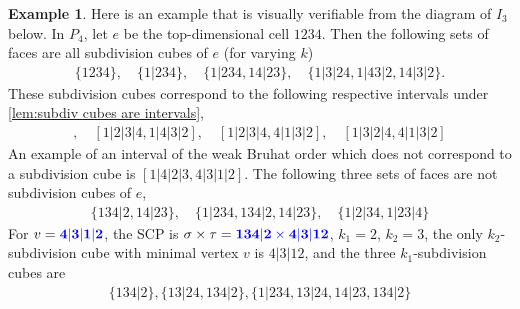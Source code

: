 \documentclass{amsart}
\newcommand{\blue}{\color{blue}} %
\theoremstyle{definition}
\newtheorem{example}[theorem]{Example}
\begin{document}
\begin{example}\label{ex:subdivision cubes}
Here is an example that is visually verifiable from the diagram of $I_3$ below.
In $P_4$, let $e$ be the top-dimensional cell $1234$. Then the following sets of faces are all subdivision cubes of $e$ (for varying $k$)
\begin{align*}
    \{1234\},\quad \{1|234\},\quad \{1|234, 14|23\},\quad \{1|3|24,1|43|2,14|3|2\}.
\end{align*}
These subdivision cubes correspond to the following respective intervals under  \cref{lem:subdiv cubes are intervals},
\begin{align*}
    [1|2|3|4,4|3|2|1],\quad [1|2|3|4,1|4|3|2],\quad [1|2|3|4,4|1|3|2],\quad [1|3|2|4, 4|1|3|2]
\end{align*}
An example of an interval of the weak Bruhat order which does not correspond to a subdivision cube is $[1|4|2|3,4|3|1|2]$.
The following three sets of faces are not subdivision cubes of $e$,
\begin{align*}
    \{134|2, 14|23\},\quad \{1|234, 134|2, 14|23\}, \quad \{1|2|34,1|23|4\}
\end{align*}
For $v = \blue{\mathbf{4|3|1|2}}$, the SCP is $\sigma\times \tau = \blue{\mathbf{134|2\times 4|3|12}}$, $k_1=2$, $k_2=3$, the only $k_2$-subdivision cube with minimal vertex $v$ is $4|3|12$, and the three $k_1$-subdivision cubes are
\begin{align*}
    \{134|2\}, \{13|24, 134|2\}, \{ 1|234, 13|24, 14|23, 134|2\}
\end{align*}


\end{example}
\end{document}
